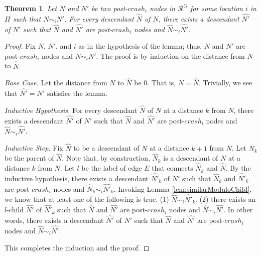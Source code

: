 \documentclass[11pt]{article}
\newtheorem{theorem}{Theorem}
\numberwithin{theorem}{section}
\begin{document}
\begin{theorem}\label{thm:similarModuloDescendant}
 Let $N$ and $N'$ be two post-$crash_i$ nodes in $\mathcal{R}^{G}$ for some location $i$ in $\Pi$ such that $N \sim_i N'$. For every descendant $\hat{N}$ of $N$, there exists a descendant $\widehat{N'}$ of $N'$ such that $\hat{N}$ and $\widehat{N'}$ are post-$crash_i$ nodes and $\hat{N} \sim_i \widehat{N'}$.
\end{theorem}
\begin{proof}
 Fix $N$, $N'$, and $i$ as in the hypothesis of the lemma; thus, $N$ and $N'$ are post-$crash_i$ nodes and $N \sim_i N'$. The proof is by induction on the distance from $N$ to $\hat{N}$.
 
 \emph{Base Case.} 
 Let the distance from $N$ to $\hat{N}$ be $0$. That is, $N=\hat{N}$. Trivially, we see that $\widehat{N'} = N'$ satisfies the lemma.
 
 \emph{Inductive Hypothesis.} 
 For every descendant $\hat{N}$ of $N$ at a distance $k$ from $N$, there exists a descendant $\widehat{N'}$ of $N'$ such that $\hat{N}$ and $\widehat{N'}$ are post-$crash_i$ nodes and $\hat{N} \sim_i \widehat{N'}$.
 
 \emph{Inductive Step.}
 Fix $\hat{N}$ to be a descendant of $N$ at a distance $k+1$ from $N$. Let $\hat{N}_k$ be the parent of $\hat{N}$. Note that, by construction, $\hat{N}_k$ is a descendant of $N$ at a distance $k$ from $N$. Let $l$ be the label of edge $E$ that connects $\hat{N}_k$ and $\hat{N}$.
 By the inductive hypothesis, there exists a descendant $\widehat{N'}_k$ of $N'$ such that $\hat{N}_k$ and $\widehat{N'}_k$ are post-$crash_i$ nodes and $\hat{N}_k \sim_i \widehat{N'}_k$.
  Invoking Lemma \ref{lem:similarModuloChild}, we know that at least one of the following is true. (1) $\hat{N} \sim_i \widehat{N'}_k$. (2) there exists an $l$-child $\widehat{N'}$ of $\widehat{N'}_k$ such that $\hat{N}$ and $\widehat{N'}$ are post-$crash_i$ nodes and $\hat{N} \sim_i \widehat{N'}$. In other words, there exists a descendant $\widehat{N'}$ of $N'$ such that  $\hat{N}$ and $\widehat{N'}$ are post-$crash_i$ nodes and $\hat{N} \sim_i \widehat{N'}$.
 
 This completes the induction and the proof.
\end{proof}
\end{document}
